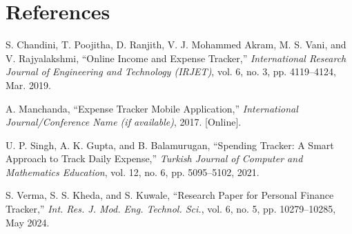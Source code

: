 \documentclass[12pt]{report} %
\begin{document}
\newpage

\chapter{References}
\renewcommand{\bibname}{}
\begin{thebibliography}{9}
\vspace{-25pt}

S. Chandini, T. Poojitha, D. Ranjith, V. J. Mohammed Akram, M. S. Vani, and V. Rajyalakshmi, ``Online Income and Expense Tracker,'' \textit{International Research Journal of Engineering and Technology (IRJET)}, vol. 6, no. 3, pp. 4119--4124, Mar. 2019.

A. Manchanda, ``Expense Tracker Mobile Application,'' \textit{International Journal/Conference Name (if available)}, 2017. [Online]. %

U. P. Singh, A. K. Gupta, and B. Balamurugan, ``Spending Tracker: A Smart Approach to Track Daily Expense,'' \textit{Turkish Journal of Computer and Mathematics Education}, vol. 12, no. 6, pp. 5095--5102, 2021.

S. Verma, S. S. Kheda, and S. Kuwale, ``Research Paper for Personal Finance Tracker,'' \textit{Int. Res. J. Mod. Eng. Technol. Sci.}, vol. 6, no. 5, pp. 10279--10285, May 2024.

\end{thebibliography}
\end{document}
